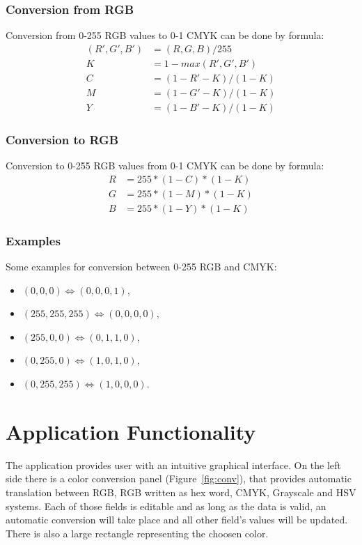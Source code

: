 \documentclass[titlepage]{article}
\begin{document}
\subsubsection{Conversion from RGB}
Conversion from 0-255 RGB values to 0-1 CMYK can be done by formula:
\begin{equation}
\begin{split}
(R', G', B') &= (R, G, B)/255 \\
K&=1-max(R', G', B')\\
C&=(1-R'-K)/(1-K)\\
M&=(1-G'-K)/(1-K)\\
Y&=(1-B'-K)/(1-K)
\end{split}
\end{equation}
\subsubsection{Conversion to RGB}
Conversion to 0-255 RGB values from 0-1 CMYK can be done by formula:
\begin{equation}
\begin{split}
R&=255*(1-C)*(1-K)\\
G&=255*(1-M)*(1-K)\\
B&=255*(1-Y)*(1-K)
\end{split}
\end{equation}

\subsubsection{Examples}
Some examples for conversion between 0-255 RGB and CMYK:
\begin{itemize}
  \item $(0, 0, 0) \Leftrightarrow (0, 0, 0, 1)$,
  \item $(255, 255, 255) \Leftrightarrow (0, 0, 0, 0)$,
  \item $(255, 0, 0) \Leftrightarrow (0, 1, 1, 0)$,
  \item $(0, 255, 0) \Leftrightarrow (1, 0, 1, 0)$,
  \item $(0, 255, 255) \Leftrightarrow (1, 0, 0, 0)$.
\end{itemize}

\clearpage
\section{Application Functionality}
The application provides user with an intuitive graphical interface. On the left
side there is a color conversion panel (Figure~\ref{fig:conv}), that provides
automatic translation between RGB, RGB written as hex word, CMYK, Grayscale and
HSV systems. Each of those fields is editable and as long as the data is valid,
an automatic conversion will take place and all other field's values will be
updated. There is also a large rectangle representing the choosen color.
\end{document}
